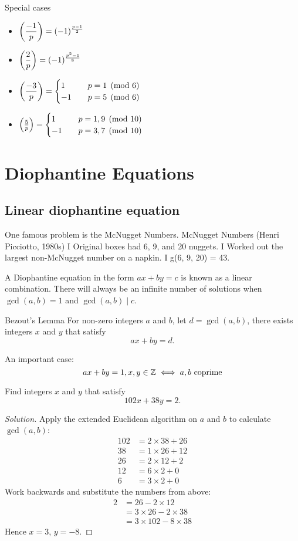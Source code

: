 Special cases
\begin{itemize}
\item $\left(\dfrac{-1}{p}\right) = (-1)^{\frac{p-1}{2}}$
\item $\left(\dfrac{2}{p}\right) = (-1)^{\frac{p^2-1}{8}}$
\item $\left(\dfrac{-3}{p}\right) = \begin{cases}
    1 & \quad p=1\pmod 6 \\
    -1 & \quad p=5\pmod 6
\end{cases}$
\item $\left(\frac{5}{p}\right) = \begin{cases}
    1 & \quad p=1,9\pmod {10} \\
    -1 & \quad p=3,7\pmod {10}
\end{cases}$
\end{itemize}

\chapter{Diophantine Equations}
\section{Linear diophantine equation}
One famous problem is the McNugget Numbers. 
McNugget Numbers (Henri Picciotto, 1980s)
I Original boxes had 6, 9, and 20 nuggets.
I Worked out the largest non-McNugget number on a napkin.
I g(6, 9, 20) = 43.

A Diophantine equation in the form $ax+by=c$ is known as a linear combination. There will always be an infinite number of solutions when $\gcd(a,b)=1$ and $\gcd(a,b)\mid c$.

\begin{thrm}{Bezout's Lemma}{}
For non-zero integers $a$ and $b$, let $d = \gcd(a,b)$, there exists integers $x$ and $y$ that satisfy
\[ ax + by = d. \] 
\end{thrm}

An important case: 
\[ ax+by=1, x,y\in\mathbb Z \iff a,b \text{ coprime} \]

\begin{exmp}{}{}
Find integers $x$ and $y$ that satisfy \[ 102x+38y=2.\] 
\end{exmp}

\begin{proof}[Solution]
Apply the extended Euclidean algorithm on $a$ and $b$ to calculate $\gcd(a,b)$:
\begin{align*}
102 &= 2 \times 38 + 26\\
38 &= 1 \times 26 + 12\\
26 &= 2 \times 12 + 2\\
12 &= 6 \times 2 + 0\\
6 &= 3 \times 2 + 0
\end{align*}
Work backwards and substitute the numbers from above:
\begin{align*}
2 &= 26 - 2 \times 12\\
&= 3 \times 26 - 2 \times 38\\
&= 3 \times 102 - 8 \times 38
\end{align*}
Hence $x=3$, $y=-8$.
\end{proof}

